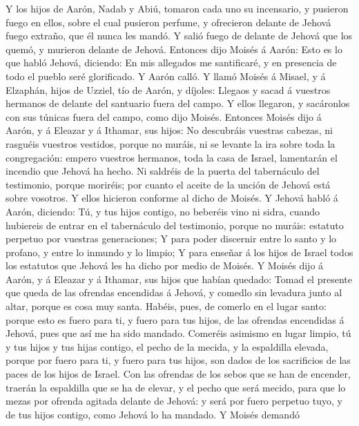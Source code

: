  Y los hijos de Aarón, Nadab y Abiú, tomaron cada uno su
incensario, y pusieron fuego en ellos, sobre el cual pusieron perfume, y
ofrecieron delante de Jehová fuego extraño, que él nunca les mandó.
 Y salió fuego de delante de Jehová que los quemó, y
murieron delante de Jehová.  Entonces dijo Moisés á Aarón:
Esto es lo que habló Jehová, diciendo: En mis allegados me santificaré,
y en presencia de todo el pueblo seré glorificado. Y Aarón calló.
 Y llamó Moisés á Misael, y á Elzaphán, hijos de Uzziel, tío
de Aarón, y díjoles: Llegaos y sacad á vuestros hermanos de delante del
santuario fuera del campo.  Y ellos llegaron, y sacáronlos
con sus túnicas fuera del campo, como dijo Moisés.  Entonces
Moisés dijo á Aarón, y á Eleazar y á Ithamar, sus hijos: No descubráis
vuestras cabezas, ni rasguéis vuestros vestidos, porque no muráis, ni se
levante la ira sobre toda la congregación: empero vuestros hermanos,
toda la casa de Israel, lamentarán el incendio que Jehová ha hecho.
 Ni saldréis de la puerta del tabernáculo del testimonio,
porque moriréis; por cuanto el aceite de la unción de Jehová está sobre
vosotros. Y ellos hicieron conforme al dicho de Moisés.  Y
Jehová habló á Aarón, diciendo:  Tú, y tus hijos contigo, no
beberéis vino ni sidra, cuando hubiereis de entrar en el tabernáculo del
testimonio, porque no muráis: estatuto perpetuo por vuestras
generaciones;  Y para poder discernir entre lo santo y lo
profano, y entre lo inmundo y lo limpio;  Y para enseñar á
los hijos de Israel todos los estatutos que Jehová les ha dicho por
medio de Moisés.  Y Moisés dijo á Aarón, y á Eleazar y á
Ithamar, sus hijos que habían quedado: Tomad el presente que queda de
las ofrendas encendidas á Jehová, y comedlo sin levadura junto al altar,
porque es cosa muy santa.  Habéis, pues, de comerlo en el
lugar santo: porque esto es fuero para ti, y fuero para tus hijos, de
las ofrendas encendidas á Jehová, pues que así me ha sido mandado.
 Comeréis asimismo en lugar limpio, tú y tus hijos y tus
hijas contigo, el pecho de la mecida, y la espaldilla elevada, porque
por fuero para ti, y fuero para tus hijos, son dados de los sacrificios
de las paces de los hijos de Israel.  Con las ofrendas de
los sebos que se han de encender, traerán la espaldilla que se ha de
elevar, y el pecho que será mecido, para que lo mezas por ofrenda
agitada delante de Jehová: y será por fuero perpetuo tuyo, y de tus
hijos contigo, como Jehová lo ha mandado.  Y Moisés demandó
